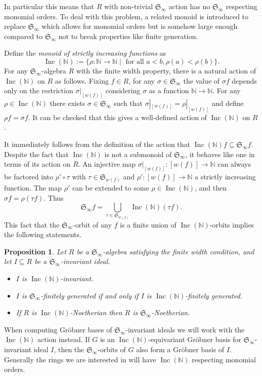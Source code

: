 \documentclass{amsart}
\newtheorem{proposition}[theorem]{Proposition}
\theoremstyle{definition}
\theoremstyle{remark}
\numberwithin{equation}{section}
\newcommand{\B}[1]{\mathbb #1}
\newcommand{\F}[1]{\mathfrak #1}
\newcommand{\Inc}{\operatorname{Inc}(\B N)}
\newcommand{\Sym}{\F S_\infty}
\begin{document}
In particular this means that $R$ with non-trivial $\Sym$ action has no $\Sym$ respecting monomial orders.  To deal with this problem, a related monoid is introduced to replace $\Sym$ which allows for monomial orders but is somehow large enough compared to $\Sym$ not to break properties like finite generation.

Define the {\em monoid of strictly increasing functions} as
\[ \Inc := \{ \rho:\B N \to \B N \mid \text{ for all } a < b, \rho(a) < \rho(b) \}. \]
For any $\Sym$-algebra $R$ with the finite width property, there is a natural action of $\Inc$ on $R$ as follows.  Fixing $f \in R$, for any $\sigma \in \Sym$ the value of $\sigma f$ depends only on the restriction $\sigma|_{[w(f)]}$ considering $\sigma$ as a function $\B N \to \B N$.  For any $\rho \in \Inc$ there exists $\sigma \in \Sym$ such that $\sigma|_{[w(f)]} = \rho|_{[w(f)]}$ and define $\rho f = \sigma f$.  It can be checked that this gives a well-defined action of $\Inc$ on $R$.

It immediately follows from the definition of the action that $\Inc f \subseteq \Sym f$.  Despite the fact that $\Inc$ is not a submonoid of $\Sym$, it behaves like one in terms of its action on $R$.  An injective map $\sigma|_{[w(f)]}: [w(f)] \to \B N$ can always be factored into $\rho' \circ \tau$ with $\tau \in \F S_{w(f)}$ and $\rho':[w(f)] \to \B N$ a strictly increasing function.  The map $\rho'$ can be extended to some $\rho \in \Inc$, and then $\sigma f = \rho (\tau f)$.  Thus
 \[ \Sym f = \bigcup_{\tau \in \F S_{w(f)}} \Inc(\tau f). \]
This fact that the $\Sym$-orbit of any $f$ is a finite union of $\Inc$-orbits implies the following statements.

\begin{proposition}
 Let $R$ be a $\Sym$-algebra satisfying the finite width condition, and let $I\subseteq R$ be a $\Sym$-invariant ideal.
 \begin{itemize}
  \item $I$ is $\Inc$-invariant.
  \item $I$ is $\Sym$-finitely generated if and only if $I$ is $\Inc$-finitely generated.
  \item If $R$ is $\Inc$-Noetherian then $R$ is $\Sym$-Noetherian.
 \end{itemize}
\end{proposition}

When computing Gr\"obner bases of $\Sym$-invariant ideals we will work with the $\Inc$ action instead.  If $G$ is an $\Inc$-equivariant Gr\"obner basis for $\Sym$-invariant ideal $I$, then the $\Sym$-orbits of $G$ also form a Gr\"obner basis of $I$.  Generally the rings we are interested in will have $\Inc$ respecting monomial orders.
\end{document}
